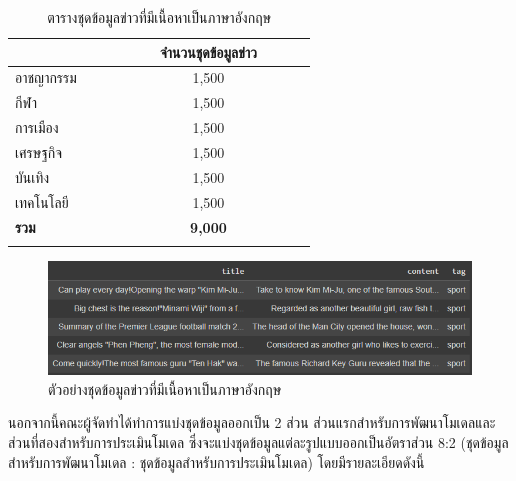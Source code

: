 \documentclass[12pt,oneside,openright,a4paper]{cpe-thai-project}
\begin{document}
\begin{itemize}
      \begin{longtable}[!ht]{p{0.15\linewidth}m{0.45\linewidth}|}
        \caption{ตารางชุดข้อมูลข่าวที่มีเนื้อหาเป็นภาษาอังกฤษ}
        \label{tbl:new_eng}\\
        \hhline{==}
        \multicolumn{1}{c}{\textbf{หมวดหมู่}} & \multicolumn{1}{c}{\textbf{จำนวนชุดข้อมูลข่าว}} \\ \hline
        \endhead
        อาชญากรรม                              & \multicolumn{1}{c}{1,500}                        \\ %
        กีฬา                                   & \multicolumn{1}{c}{1,500}                         \\ %
        การเมือง                               & \multicolumn{1}{c}{1,500}                          \\ %
        เศรษฐกิจ                                 & \multicolumn{1}{c}{1,500}                          \\ %
        บันเทิง                                & \multicolumn{1}{c}{1,500}                          \\ %
        เทคโนโลยี                              & \multicolumn{1}{c}{1,500}                          \\ \hline
        \textbf{รวม}                           & \multicolumn{1}{c}{\textbf{9,000}}                        \\ \hhline{==}
      \end{longtable}
      \newpage

      \begin{figure}[!ht]\centering
        \includegraphics[width=13cm]{./img/news_eng.png}
        \caption{ตัวอย่างชุดข้อมูลข่าวที่มีเนื้อหาเป็นภาษาอังกฤษ}\label{fig:new_eng}
      \end{figure}

      \hspace{1cm}นอกจากนี้คณะผู้จัดทำได้ทำการแบ่งชุดข้อมูลออกเป็น 2 ส่วน ส่วนแรกสำหรับการพัฒนาโมเดลและส่วนที่สองสำหรับการประเมินโมเดล
      ซึ่งจะแบ่งชุดข้อมูลแต่ละรูปแบบออกเป็นอัตราส่วน 8:2 (ชุดข้อมูลสำหรับการพัฒนาโมเดล : ชุดข้อมูลสำหรับการประเมินโมเดล)
      โดยมีรายละเอียดดังนี้


\end{itemize}
\end{document}

